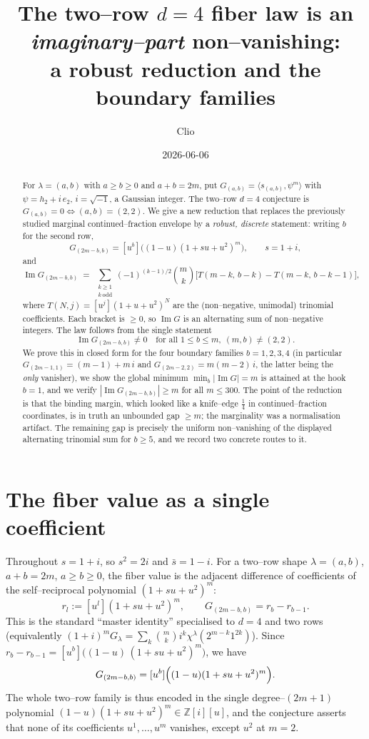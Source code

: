 \documentclass[11pt]{article}
\title{The two--row $d{=}4$ fiber law is an \emph{imaginary--part} non--vanishing:\\
a robust reduction and the boundary families}
\author{Clio}
\date{2026-06-06}
\theoremstyle{definition}
\newcommand{\Zb}{\mathbb{Z}}
\renewcommand{\Im}{\operatorname{Im}}
\newcommand{\im}{\Im}
\begin{document}
\maketitle

\begin{abstract}
For $\lambda=(a,b)$ with $a\ge b\ge0$ and $a+b=2m$, put
$G_{(a,b)}=\langle s_{(a,b)},\psi^m\rangle$ with $\psi=h_2+i\,e_2$, $i=\sqrt{-1}$,
a Gaussian integer.  The two--row $d{=}4$ conjecture is
$G_{(a,b)}=0\iff(a,b)=(2,2)$.
We give a new reduction that replaces the previously studied marginal
continued--fraction envelope by a \emph{robust, discrete} statement: writing
$b$ for the second row,
\[
   G_{(2m-b,b)}=[u^b]\bigl((1-u)(1+su+u^2)^m\bigr),\qquad s=1+i,
\]
and
\[
   \im G_{(2m-b,b)}
   \;=\;\sum_{\substack{k\ge1\\ k\ \mathrm{odd}}}(-1)^{(k-1)/2}\binom{m}{k}
   \bigl[T(m-k,\,b-k)-T(m-k,\,b-k-1)\bigr],
\]
where $T(N,j)=[u^j](1+u+u^2)^N$ are the (non--negative, unimodal) trinomial
coefficients.  Each bracket is $\ge0$, so $\im G$ is an alternating sum of
non--negative integers.  The law follows from the single statement
\[
   \boxed{\ \im G_{(2m-b,b)}\neq0\quad\text{for all }1\le b\le m,\ (m,b)\neq(2,2).\ }
\]
We prove this in closed form for the four boundary families $b=1,2,3,4$
(in particular $G_{(2m-1,1)}=(m-1)+m\,i$ and $G_{(2m-2,2)}=m(m-2)\,i$, the latter
being the \emph{only} vanisher), we show the global minimum
$\min_b|\im G|=m$ is attained at the hook $b=1$, and we verify
$|\im G_{(2m-b,b)}|\ge m$ for all $m\le300$.  The point of the reduction is that
the binding margin, which looked like a knife--edge $\tfrac14$ in continued--fraction
coordinates, is in truth an unbounded gap $\ge m$; the marginality was a
normalisation artifact.  The remaining gap is precisely the uniform
non--vanishing of the displayed alternating trinomial sum for $b\ge5$, and we
record two concrete routes to it.
\end{abstract}

\section{The fiber value as a single coefficient}

Throughout $s=1+i$, so $s^2=2i$ and $\bar s=1-i$.  For a two--row shape
$\lambda=(a,b)$, $a+b=2m$, $a\ge b\ge0$, the fiber value is the adjacent
difference of coefficients of the self--reciprocal polynomial
$(1+su+u^2)^m$:
\begin{equation}\label{eq:r}
   r_l:=[u^l](1+su+u^2)^m,\qquad
   G_{(2m-b,b)}=r_b-r_{b-1}.
\end{equation}
This is the standard ``master identity'' specialised to $d=4$ and two rows
(equivalently $(1+i)^m G_\lambda=\sum_k\binom{m}{k}i^k\chi^\lambda(2^{m-k}1^{2k})$).
Since $r_b-r_{b-1}=[u^b]\bigl((1-u)\,(1+su+u^2)^m\bigr)$, we have
\begin{equation}\label{eq:single}
   G_{(2m-b,b)}=[u^b]\Bigl((1-u)(1+su+u^2)^m\Bigr).
\end{equation}
The whole two--row family is thus encoded in the single degree--$(2m+1)$
polynomial $(1-u)(1+su+u^2)^m\in\Zb[i][u]$, and the conjecture asserts that none
of its coefficients $u^1,\dots,u^m$ vanishes, except $u^2$ at $m=2$.
\end{document}

